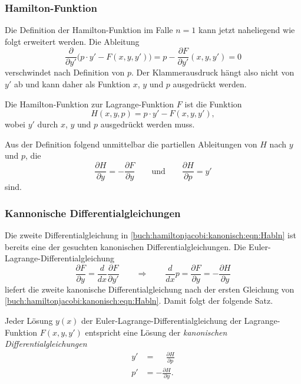 %
%
\subsubsection{Hamilton-Funktion}
Die Definition der Hamilton-Funktion im Falle $n=1$ kann jetzt
naheliegend wie folgt erweitert werden.
Die Ableitung
\begin{equation*}
\frac{\partial}{\partial y'}
\bigl(
p\cdot y'
-
F(x,y,y')
\bigr)
=
p
-
\frac{\partial F}{\partial y'}(x,y,y')
=
0
\end{equation*}
verschwindet nach Definition von $p$.
Der Klammerausdruck hängt also nicht von $y'$ ab und kann daher 
als Funktion $x$, $y$ und $p$ ausgedrückt werden.

\begin{definition}
Die Hamilton-Funktion zur Lagrange-Funktion $F$ ist die Funktion
\[
H(x,y,p)
=
p\cdot y' - F(x,y,y'),
\]
wobei $y'$ durch $x$, $y$ und $p$ ausgedrückt werden muss.
\end{definition}

Aus der Definition folgend unmittelbar die partiellen Ableitungen
von $H$ nach $y$ und $p$, die
\begin{equation}
\frac{\partial H}{\partial y}
=
-\frac{\partial F}{\partial y}
\qquad\text{und}\qquad
\frac{\partial H}{\partial p}
=
y'
\label{buch:hamiltonjacobi:kanonisch:eqn:Habln}
\end{equation}
sind.

%
%
\subsubsection{Kannonische Differentialgleichungen}
Die zweite Differentialgleichung in
\eqref{buch:hamiltonjacobi:kanonisch:eqn:Habln}
ist bereits eine der gesuchten kanonischen Differentialgleichungen.
Die Euler-Lagrange-Differentialgleichung
\[
\frac{\partial F}{\partial y}=
\frac{d}{dx}\frac{\partial F}{\partial y'}
\qquad\Rightarrow\qquad
\frac{d}{dx}p
=
\frac{\partial F}{\partial y}
=
-\frac{\partial H}{\partial y}
\]
liefert die zweite kanonische Differentialgleichung nach der
ersten Gleichung von \eqref{buch:hamiltonjacobi:kanonisch:eqn:Habln}.
Damit folgt der folgende Satz.

\begin{satz}
\label{buch:hamiltonjacobi:kanonisch:satz:kandgln}
Jeder Lösung $y(x)$ der Euler-Lagrange-Differentialgleichung der
Lagrange-Funktion $F(x,y,y')$ entspricht eine Lösung
der {\em kanonischen Differentialgleichungen}
\begin{equation}
\begin{aligned}
y'&=\phantom{-}\frac{\partial H}{\partial p}
\\
p'&=-\frac{\partial H}{\partial y}.
\end{aligned}
\end{equation}
\end{satz}

